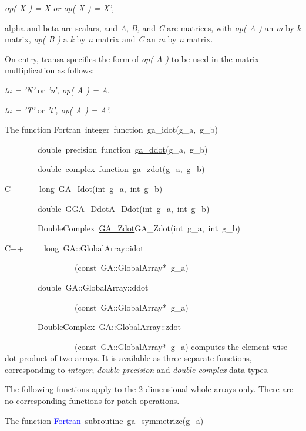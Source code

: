 \emph{op( X ) = X or op( X ) = X',}

alpha and beta are scalars, and \emph{A}, \emph{B,} and \emph{C} are
matrices, with \emph{op( A ) }an \emph{m} by \emph{k} matrix, \emph{op(
B )} a \emph{k} by \emph{n} matrix and \emph{C} an \emph{m} by \emph{n}
matrix.

On entry, transa specifies the form of \emph{op( A )} to be used in
the matrix multiplication as follows: 

\emph{ta = 'N'} or\emph{ 'n', op( A ) = A}. 

\emph{ta = 'T'} or \emph{'t', op( A ) = A'}.

The function
Fortran~integer~function~ga\_idot(g\_a,~g\_b)~

~~~~~~~~double~precision~function~\href{http://www.emsl.pnl.gov/docs/global/ga_ops.html\#ga_ddot}{ga\_{}ddot}(g\_a,~g\_b)

~~~~~~~~double~complex~function~\href{http://www.emsl.pnl.gov/docs/global/ga_ops.html\#ga_zdot}{ga\_{}zdot}(g\_a,~g\_b)~

C~~~~~~~long~\href{http://www.emsl.pnl.gov/docs/global/c_nga_ops.html\#ga_dot}{GA\_{}Idot}(int~g\_a,~int~g\_b)~

~~~~~~~~double~G\href{http://www.emsl.pnl.gov/docs/global/c_nga_ops.html\#ga_dot}{GA\_{}Ddot}A\_Ddot(int~g\_a,~int~g\_b)~

~~~~~~~~DoubleComplex~\href{http://www.emsl.pnl.gov/docs/global/c_nga_ops.html\#ga_dot}{GA\_{}Zdot}GA\_Zdot(int~g\_a,~int~g\_b)~

C++~~~~~long~GA::GlobalArray::idot

~~~~~~~~~~~~~~~~~(const~GA::GlobalArray{*}~g\_a)~

~~~~~~~~double~GA::GlobalArray::ddot

~~~~~~~~~~~~~~~~~(const~GA::GlobalArray{*}~g\_a)~

~~~~~~~~DoubleComplex~GA::GlobalArray::zdot

~~~~~~~~~~~~~~~~~(const~GA::GlobalArray{*}~g\_a)
computes the element-wise dot product of two arrays. It is available
as three separate functions, corresponding to \emph{integer}, \emph{double
precision} and \emph{double complex} data types.

The following functions apply to the 2-dimensional whole arrays only.
There are no corresponding functions for patch operations.

The function
\textcolor{blue}{Fortran}~subroutine~\href{http://www.emsl.pnl.gov/docs/global/ga_ops.html\#ga_symmetrize}{ga\_{}symmetrize}(g\_a)~

